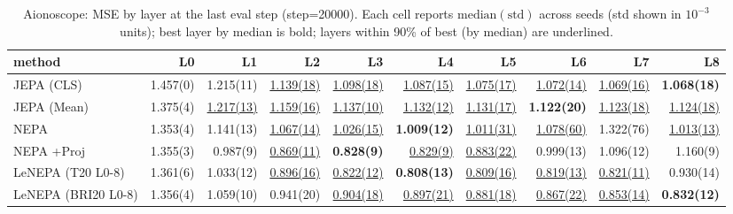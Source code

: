 \begin{table}[t]
\centering
\scriptsize
\caption{Aionoscope: MSE by layer at the last eval step (step=20000). Each cell reports $\mathrm{median}(\mathrm{std})$ across seeds (std shown in $10^{-3}$ units); best layer by median is bold; layers within 90\% of best (by median) are underlined.}
\label{tab:aiono_last_step_by_layer_mse}
\begin{tabular}{lrrrrrrrrr}
\toprule
method & L0 & L1 & L2 & L3 & L4 & L5 & L6 & L7 & L8 \\
\midrule
JEPA (CLS) & 1.457(0) & 1.215(11) & \underline{1.139(18)} & \underline{1.098(18)} & \underline{1.087(15)} & \underline{1.075(17)} & \underline{1.072(14)} & \underline{1.069(16)} & \textbf{1.068(18)} \\
JEPA (Mean) & 1.375(4) & \underline{1.217(13)} & \underline{1.159(16)} & \underline{1.137(10)} & \underline{1.132(12)} & \underline{1.131(17)} & \textbf{1.122(20)} & \underline{1.123(18)} & \underline{1.124(18)} \\
NEPA & 1.353(4) & 1.141(13) & \underline{1.067(14)} & \underline{1.026(15)} & \textbf{1.009(12)} & \underline{1.011(31)} & \underline{1.078(60)} & 1.322(76) & \underline{1.013(13)} \\
NEPA +Proj & 1.355(3) & 0.987(9) & \underline{0.869(11)} & \textbf{0.828(9)} & \underline{0.829(9)} & \underline{0.883(22)} & 0.999(13) & 1.096(12) & 1.160(9) \\
LeNEPA (T20 L0-8) & 1.361(6) & 1.033(12) & \underline{0.896(16)} & \underline{0.822(12)} & \textbf{0.808(13)} & \underline{0.809(16)} & \underline{0.819(13)} & \underline{0.821(11)} & 0.930(14) \\
LeNEPA (BRI20 L0-8) & 1.356(4) & 1.059(10) & 0.941(20) & \underline{0.904(18)} & \underline{0.897(21)} & \underline{0.881(18)} & \underline{0.867(22)} & \underline{0.853(14)} & \textbf{0.832(12)} \\
\bottomrule
\end{tabular}
\end{table}
